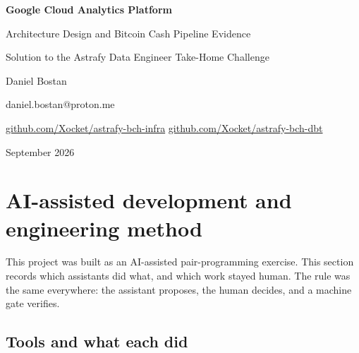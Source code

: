 \documentclass[10pt,a4paper]{article}
\begin{document}
\begin{titlepage}
\centering
\vspace*{3cm}
{\Huge\bfseries Google Cloud Analytics Platform\par}
\vspace{0.4cm}
{\Large Architecture Design and Bitcoin Cash Pipeline Evidence\par}
\vspace{1.2cm}
{\large Solution to the Astrafy Data Engineer Take-Home Challenge\par}
\vspace{2.2cm}
{\large Daniel Bostan\par}
\vspace{0.9cm}
{\normalsize daniel.bostan@proton.me\par}
\vspace{0.2cm}
{\normalsize \href{https://github.com/Xocket/astrafy-bch-infra}{github.com/Xocket/astrafy-bch-infra}
\quad
\href{https://github.com/Xocket/astrafy-bch-dbt}{github.com/Xocket/astrafy-bch-dbt}\par}
\vfill
{\normalsize September 2026\par}
\end{titlepage}

\tableofcontents
\clearpage

\section{AI-assisted development and engineering method}

This project was built as an AI-assisted pair-programming exercise. This
section records which assistants did what, and which work stayed human.
The rule was the same everywhere: the assistant proposes, the human
decides, and a machine gate verifies.

\subsection{Tools and what each did}
\end{document}
